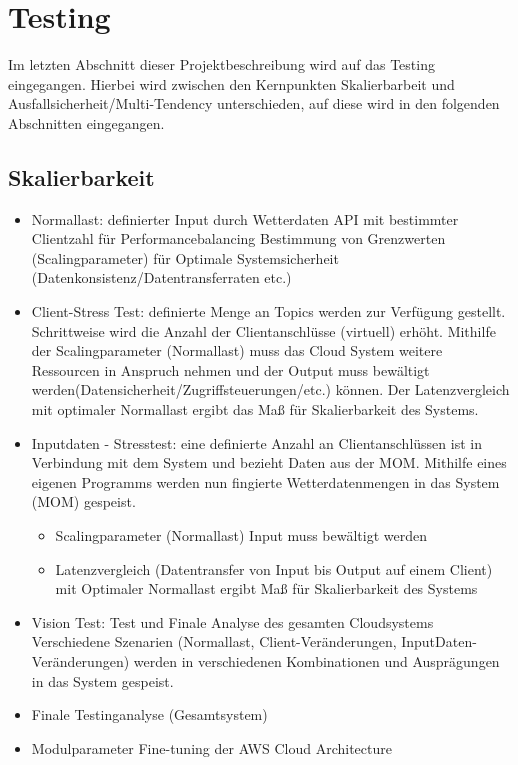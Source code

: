 \documentclass[paper,oneside,onecolumn,notitlepage,bibtotocnumbered,fontsize=12pt,bigheadings,ngerman]{scrartcl}
\begin{document}
\section{Testing}

Im letzten Abschnitt dieser Projektbeschreibung wird auf das Testing eingegangen. Hierbei wird zwischen den Kernpunkten Skalierbarbeit und Ausfallsicherheit/Multi-Tendency unterschieden, auf diese wird in den folgenden Abschnitten eingegangen.

\subsection{Skalierbarkeit}
\begin{itemize}
\item Normallast:	definierter Input durch Wetterdaten API mit bestimmter Clientzahl für Performancebalancing 
Bestimmung von Grenzwerten (Scalingparameter) für Optimale Systemsicherheit (Datenkonsistenz/Datentransferraten etc.)
\item Client-Stress Test:	definierte Menge an Topics werden  zur Verfügung gestellt. Schrittweise wird die Anzahl der Clientanschlüsse (virtuell) erhöht.  
Mithilfe der Scalingparameter (Normallast) muss das Cloud System weitere Ressourcen in Anspruch nehmen und der Output muss bewältigt werden(Datensicherheit/Zugriffsteuerungen/etc.) können. Der Latenzvergleich mit optimaler Normallast ergibt das Maß für Skalierbarkeit des Systems.
\item Inputdaten - Stresstest:	eine definierte Anzahl an Clientanschlüssen ist in Verbindung mit dem System und bezieht Daten aus der MOM. Mithilfe eines eigenen Programms werden nun fingierte Wetterdatenmengen in das System (MOM) gespeist.
\begin{itemize}
\item Scalingparameter (Normallast) Input muss bewältigt werden
\item Latenzvergleich  (Datentransfer von Input bis Output auf einem Client) mit Optimaler Normallast ergibt Maß für Skalierbarkeit des Systems
\end{itemize}
\item Vision Test: Test und Finale Analyse des gesamten Cloudsystems 
Verschiedene Szenarien  (Normallast, Client-Veränderungen, InputDaten-Veränderungen) werden in verschiedenen Kombinationen und Ausprägungen in das System gespeist.
\item Finale Testinganalyse (Gesamtsystem)
\item Modulparameter Fine-tuning der AWS Cloud Architecture
\clearpage
\end{itemize}
\end{document}
